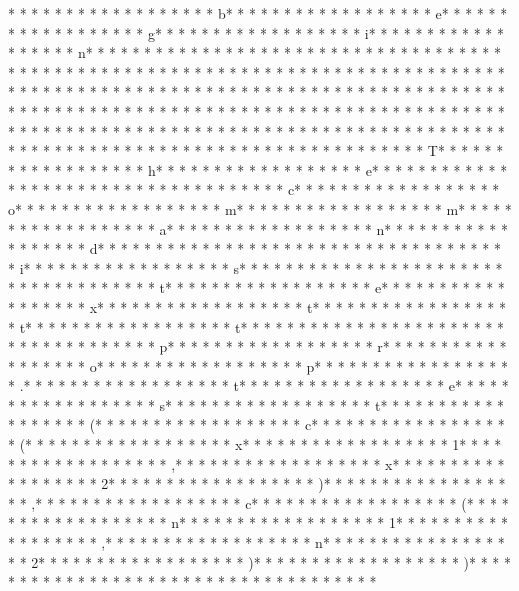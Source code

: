 * * *  * * *  * * *  *  * * *  *  * * *  * b* * *  * * *  * * *  *  * * *  *  * * *  * e* * *  * * *  * * *  *  * * *  *  * * *  * g* * *  * * *  * * *  *  * * *  *  * * *  * i* * *  * * *  * * *  *  * * *  *  * * *  * n* * *  * * *  * * *  *  * * *  *  * * *  * {* * *  * * *  * * *  *  * * *  *  * * *  *  * * *  * * *  * * *  *  * * *  *  * * *  * }* * *  * * *  * * *  *  * * *  *  * * *  * 
* * *  * * *  * * *  *  * * *  *  * * *  * * *  * * *  *  * * *  *  * * *  * * *  * * *  *  * * *  *  * * *  *  * * *  * * *  * * *  *  * * *  *  * * *  *  * * *  * * *  * * *  *  * * *  *  * * *  *  * * *  * * *  * * *  *  * * *  *  * * *  *  * * *  * * *  * * *  *  * * *  *  * * *  *  * * *  * * *  * * *  *  * * *  *  * * *  *  * * *  * * *  * * *  *  * * *  *  * * *  *  * * *  * * *  * * *  *  * * *  *  * * *  * T* * *  * * *  * * *  *  * * *  *  * * *  * h* * *  * * *  * * *  *  * * *  *  * * *  * e* * *  * * *  * * *  *  * * *  *  * * *  *  * * *  * * *  * * *  *  * * *  *  * * *  * c* * *  * * *  * * *  *  * * *  *  * * *  * o* * *  * * *  * * *  *  * * *  *  * * *  * m* * *  * * *  * * *  *  * * *  *  * * *  * m* * *  * * *  * * *  *  * * *  *  * * *  * a* * *  * * *  * * *  *  * * *  *  * * *  * n* * *  * * *  * * *  *  * * *  *  * * *  * d* * *  * * *  * * *  *  * * *  *  * * *  *  * * *  * * *  * * *  *  * * *  *  * * *  * i* * *  * * *  * * *  *  * * *  *  * * *  * s* * *  * * *  * * *  *  * * *  *  * * *  *  * * *  * * *  * * *  *  * * *  *  * * *  * t* * *  * * *  * * *  *  * * *  *  * * *  * e* * *  * * *  * * *  *  * * *  *  * * *  * x* * *  * * *  * * *  *  * * *  *  * * *  * t* * *  * * *  * * *  *  * * *  *  * * *  * t* * *  * * *  * * *  *  * * *  *  * * *  * t* * *  * * *  * * *  *  * * *  *  * * *  * {* * *  * * *  * * *  *  * * *  *  * * *  * p* * *  * * *  * * *  *  * * *  *  * * *  * r* * *  * * *  * * *  *  * * *  *  * * *  * o* * *  * * *  * * *  *  * * *  *  * * *  * p* * *  * * *  * * *  *  * * *  *  * * *  * .* * *  * * *  * * *  *  * * *  *  * * *  * t* * *  * * *  * * *  *  * * *  *  * * *  * e* * *  * * *  * * *  *  * * *  *  * * *  * s* * *  * * *  * * *  *  * * *  *  * * *  * t* * *  * * *  * * *  *  * * *  *  * * *  * (* * *  * * *  * * *  *  * * *  *  * * *  * c* * *  * * *  * * *  *  * * *  *  * * *  * (* * *  * * *  * * *  *  * * *  *  * * *  * x* * *  * * *  * * *  *  * * *  *  * * *  * 1* * *  * * *  * * *  *  * * *  *  * * *  * ,* * *  * * *  * * *  *  * * *  *  * * *  * x* * *  * * *  * * *  *  * * *  *  * * *  * 2* * *  * * *  * * *  *  * * *  *  * * *  * )* * *  * * *  * * *  *  * * *  *  * * *  * ,* * *  * * *  * * *  *  * * *  *  * * *  * c* * *  * * *  * * *  *  * * *  *  * * *  * (* * *  * * *  * * *  *  * * *  *  * * *  * n* * *  * * *  * * *  *  * * *  *  * * *  * 1* * *  * * *  * * *  *  * * *  *  * * *  * ,* * *  * * *  * * *  *  * * *  *  * * *  * n* * *  * * *  * * *  *  * * *  *  * * *  * 2* * *  * * *  * * *  *  * * *  *  * * *  * )* * *  * * *  * * *  *  * * *  *  * * *  * )* * *  * * *  * * *  *  * * *  *  * * *  * }* * *  * * *  * * *  *  * * *  *  * * *  * 

